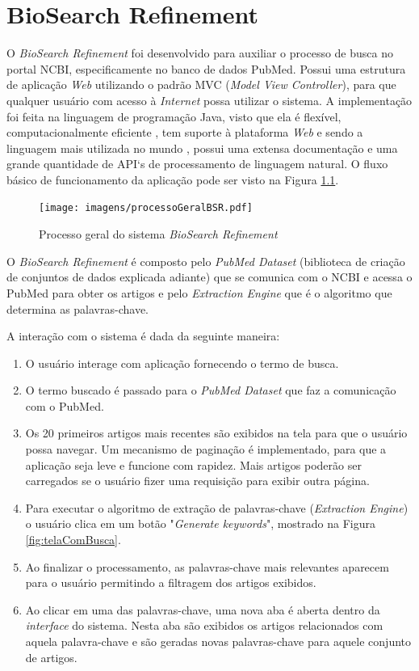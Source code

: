 \chapter{BioSearch Refinement}

O \emph{BioSearch Refinement} foi desenvolvido para auxiliar o processo de busca no portal NCBI, especificamente no banco de dados PubMed. Possui uma estrutura de aplicação \emph{Web} utilizando o padrão MVC (\emph{Model View Controller}), para que qualquer usuário com acesso à \emph{Internet} possa utilizar o sistema. A implementação foi feita na linguagem de programação Java, visto que ela é flexível, computacionalmente eficiente \cite{Oracle2010}, tem suporte à plataforma \emph{Web} e sendo a linguagem mais utilizada no mundo \cite{TIOBE2011}, possui uma extensa documentação e uma grande quantidade de API`s de processamento de linguagem natural. O fluxo básico de funcionamento da aplicação pode ser visto na Figura \ref{fig:1}. 
\begin{figure}[h!]
    \center
    \texttt{[image: imagens/processoGeralBSR.pdf]}
    \caption{Processo geral do sistema \emph{BioSearch Refinement} \label{fig:1}} 
\end{figure}

O \emph{BioSearch Refinement} é composto pelo \emph{PubMed Dataset} (biblioteca de criação de conjuntos de dados explicada adiante) que se comunica com o NCBI e acessa o PubMed para obter os artigos e pelo \emph{Extraction Engine} que é o algoritmo que determina as palavras-chave.

A interação com o sistema é dada da seguinte maneira:

\begin{enumerate}
    \item O usuário interage com aplicação fornecendo o termo de busca.
    \item O termo buscado é passado para o \emph{PubMed Dataset}  que faz a comunicação com o PubMed.
    \item Os 20 primeiros artigos mais recentes são exibidos na tela para que o usuário possa navegar. Um mecanismo de paginação é implementado, para que a aplicação seja leve e funcione com rapidez. Mais artigos poderão ser carregados se o usuário fizer uma requisição para exibir outra página.
    \item Para executar o algoritmo de extração de palavras-chave (\emph{Extraction Engine}) o usuário clica em um botão "\emph{Generate keywords}", mostrado na Figura \ref{fig:telaComBusca}.
    \item Ao finalizar o processamento, as palavras-chave mais relevantes aparecem para o usuário permitindo a filtragem dos artigos exibidos.
    \item Ao clicar em uma das palavras-chave, uma nova aba é aberta dentro da \emph{interface} do sistema. Nesta aba são exibidos os artigos relacionados com aquela palavra-chave e são geradas novas palavras-chave para aquele conjunto de artigos.
\end{enumerate}

